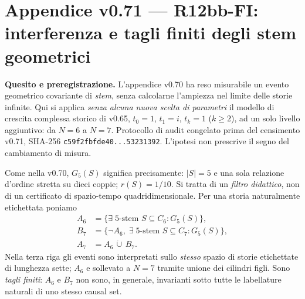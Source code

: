 \documentclass[11pt,a4paper]{article}
\begin{document}
\clearpage
\section*{Appendice v0.71 --- R12bb-FI: interferenza e tagli finiti degli stem geometrici}
\textbf{Quesito e preregistrazione.} L'appendice v0.70 ha reso misurabile un evento geometrico covariante di \emph{stem}, senza calcolarne l'ampiezza nel limite delle storie infinite. Qui si applica \emph{senza alcuna nuova scelta di parametri} il modello di crescita complessa storico di v0.65, $t_0=1$, $t_1=i$, $t_k=1$ ($k\ge2$), ad un solo livello aggiuntivo: da $N=6$ a $N=7$. Protocollo di audit congelato prima del censimento v0.71, SHA-256 \texttt{c59f2fbfde40...53231392}. L'ipotesi non prescrive il segno del cambiamento di misura.

Come nella v0.70, $G_5(S)$ significa precisamente: $|S|=5$ e una sola relazione d'ordine stretta su dieci coppie; $r(S)=1/10$. Si tratta di un \emph{filtro didattico}, non di un certificato di spazio-tempo quadridimensionale. Per una storia naturalmente etichettata poniamo
\begin{equation}
\begin{aligned}
A_6&=\{\exists\;5\text{-stem }S\subseteq C_6:G_5(S)\},\\
B_7&=\{\neg A_6,\;\exists\;5\text{-stem }S\subseteq C_7:G_5(S)\},\\
A_7&=A_6\,\dot\cup\,B_7.
\end{aligned}\tag{FI.1}
\end{equation}
Nella terza riga gli eventi sono interpretati sullo \emph{stesso} spazio di storie etichettate di lunghezza sette; $A_6$ e sollevato a $N=7$ tramite unione dei cilindri figli. Sono \emph{tagli finiti}: $A_6$ e $B_7$ non sono, in generale, invarianti sotto tutte le labellature naturali di uno stesso causal set.
\end{document}
